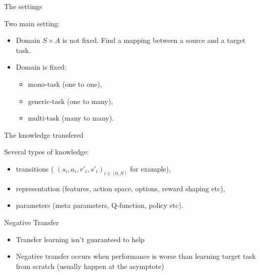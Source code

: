 \documentclass{beamer}
\begin{document}
    \begin{frame}{The settings}

        Two main setting:

        \begin{itemize}
            \item Domain $S\times A$ is not fixed. Find a mapping between a source and a target task.
            \item Domain is fixed:
            \begin{itemize}
                \item mono-task (one to one),
                \item generic-task (one to many),
                \item multi-task  (many to many).
            \end{itemize}
        \end{itemize}

    \end{frame}

    \begin{frame}{The knowledge transfered}

        Several types of knowledge:
        \begin{itemize}
            \item transitions ( ${(s_i,a_i,r'_i,s'_i)}_{i\in[0,N]}$ for example),
            \item representation (features, action space, options, reward shaping etc),
            \item parameters (meta parameters, Q-function, policy etc).
        \end{itemize}

    \end{frame}

    \begin{frame}{Negative Transfer}

        \begin{itemize}
            \item Transfer learning isn’t guaranteed to help
            \item Negative transfer occurs when performance is worse than learning
            target task from scratch (usually happen at the asymptote)
        \end{itemize}

    \end{frame}


\end{document}
